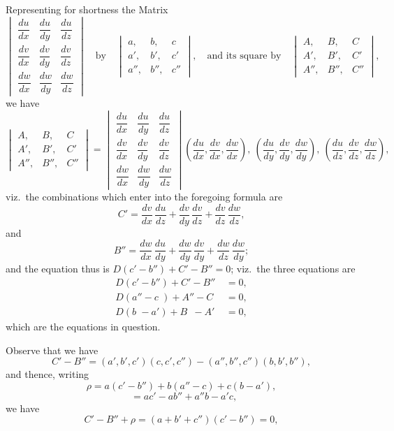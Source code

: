 \documentclass[11pt,a4paper]{article}
\begin{document}
Representing for shortness the Matrix
\[
\begin{vmatrix}
\dfrac{du}{dx} & \dfrac{du}{dy} & \dfrac{du}{dz} \\[6pt]
\dfrac{dv}{dx} & \dfrac{dv}{dy} & \dfrac{dv}{dz} \\[6pt]
\dfrac{dw}{dx} & \dfrac{dw}{dy} & \dfrac{dw}{dz}
\end{vmatrix}
\quad \text{by} \quad
\begin{vmatrix} a, & b, & c \\ a', & b', & c' \\ a'', & b'', & c'' \end{vmatrix},
\quad \text{and its square by} \quad
\begin{vmatrix} A, & B, & C \\ A', & B', & C' \\ A'', & B'', & C'' \end{vmatrix},
\]
we have
\[
\begin{vmatrix} A, & B, & C \\ A', & B', & C' \\ A'', & B'', & C'' \end{vmatrix}
= \begin{vmatrix} \dfrac{du}{dx} & \dfrac{du}{dy} & \dfrac{du}{dz} \\[6pt]
\dfrac{dv}{dx} & \dfrac{dv}{dy} & \dfrac{dv}{dz} \\[6pt]
\dfrac{dw}{dx} & \dfrac{dw}{dy} & \dfrac{dw}{dz} \end{vmatrix}
\left(\frac{du}{dx},\frac{dv}{dx},\frac{dw}{dx}\right)\!,\ \left(\frac{du}{dy},\frac{dv}{dy},\frac{dw}{dy}\right)\!,\ \left(\frac{du}{dz},\frac{dv}{dz},\frac{dw}{dz}\right),
\]
viz.\ the combinations which enter into the foregoing formula are
\[
C' = \frac{dv}{dx}\,\frac{du}{dz} + \frac{dv}{dy}\,\frac{dv}{dz} + \frac{dv}{dz}\,\frac{dw}{dz},
\]
and
\[
B'' = \frac{dw}{dx}\,\frac{du}{dy} + \frac{dw}{dy}\,\frac{dv}{dy} + \frac{dw}{dz}\,\frac{dw}{dy};
\]
and the equation thus is $D(c' - b'') + C' - B'' = 0$; viz.\ the three equations are
\begin{align*}
D(c' - b'') + C' - B'' &= 0,\\
D(a'' - c\phantom{'}) + A'' - C\phantom{'} &= 0,\\
D(b\phantom{'} - a') + B\phantom{''} - A'\phantom{'} &= 0,
\end{align*}
which are the equations in question.

\smallskip
Observe that we have
\[
C' - B'' = (a', b', c')(c, c', c'') - (a'', b'', c'')(b, b', b''),
\]
and thence, writing
\[
\rho = a(c'- b'') + b(a''-c) + c(b - a'),
\]
\[
\phantom{\rho} = ac' - ab'' + a''b - a'c,
\]
we have
\[
C' - B'' + \rho = (a + b' + c'')(c' - b'') = 0,
\]
\end{document}
